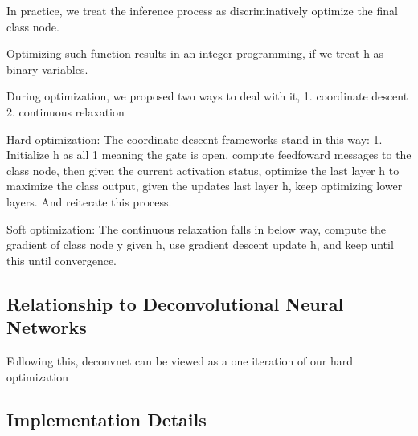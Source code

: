 In practice, we treat the inference process as discriminatively optimize the final class node. 

Optimizing such function results in an integer programming, if we treat h as binary variables. 

During optimization, we proposed two ways to deal with it, 1. coordinate descent 2. continuous relaxation

Hard optimization: The coordinate descent frameworks stand in this way: 1. Initialize h as all 1 meaning the gate is open, compute feedfoward messages to the class node, then given the current activation status, optimize the last layer h to maximize the class output, given the updates last layer h, keep optimizing lower layers. And reiterate this process.

Soft optimization: The continuous relaxation falls in below way, compute the gradient of class node y given h, use gradient descent update h, and keep until this until convergence.

\subsection{Relationship to Deconvolutional Neural Networks}

Following this, deconvnet can be viewed as a one iteration of our hard optimization

\subsection{Implementation Details}
